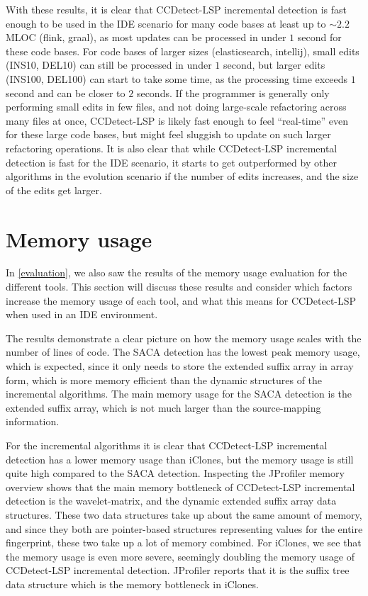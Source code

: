 With these results, it is clear that CCDetect-LSP incremental detection is fast enough to
be used in the IDE scenario for many code bases at least up to ${\sim}2.2$MLOC (flink,
graal), as most updates can be processed in under $1$ second for these code bases. For
code bases of larger sizes (elasticsearch, intellij), small edits (INS10, DEL10) can still
be processed in under $1$ second, but larger edits (INS100, DEL100) can start to take some
time, as the processing time exceeds $1$ second and can be closer to $2$ seconds. If the
programmer is generally only performing small edits in few files, and not doing
large-scale refactoring across many files at once, CCDetect-LSP is likely fast enough to
feel ``real-time'' even for these large code bases, but might feel sluggish to update on
such larger refactoring operations. It is also clear that while CCDetect-LSP incremental
detection is fast for the IDE scenario, it starts to get outperformed by other algorithms
in the evolution scenario if the number of edits increases, and the size of the edits get
larger.

\section{Memory usage}

In \cref{evaluation}, we also saw the results of the memory usage evaluation for the
different tools. This section will discuss these results and consider which factors
increase the memory usage of each tool, and what this means for CCDetect-LSP when used in
an IDE environment.

The results demonstrate a clear picture on how the memory usage scales with the number of
lines of code. The SACA detection has the lowest peak memory usage, which is expected,
since it only needs to store the extended suffix array in array form, which is more memory
efficient than the dynamic structures of the incremental algorithms. The main memory usage
for the SACA detection is the extended suffix array, which is not much larger than the
source-mapping information.

For the incremental algorithms it is clear that CCDetect-LSP incremental detection has a
lower memory usage than iClones, but the memory usage is still quite high compared to the
SACA detection. Inspecting the JProfiler memory overview shows that the main memory
bottleneck of CCDetect-LSP incremental detection is the wavelet-matrix, and the dynamic
extended suffix array data structures. These two data structures take up about the same
amount of memory, and since they both are pointer-based structures representing values for
the entire fingerprint, these two take up a lot of memory combined. For iClones, we see
that the memory usage is even more severe, seemingly doubling the memory usage of
CCDetect-LSP incremental detection. JProfiler reports that it is the suffix tree data
structure which is the memory bottleneck in iClones. 

